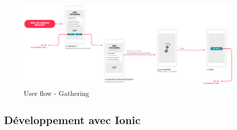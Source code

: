 \documentclass[french]{article}
\begin{document}
	\begin{figure}[H]
		\centering
		\includegraphics[scale=0.6]{../user-flow/user-flow-5.png}
		\caption{User flow - Gathering}
		\label{User flow - Gathering}
	\end{figure}
	
	\subsection{Développement avec Ionic}
\end{document}
